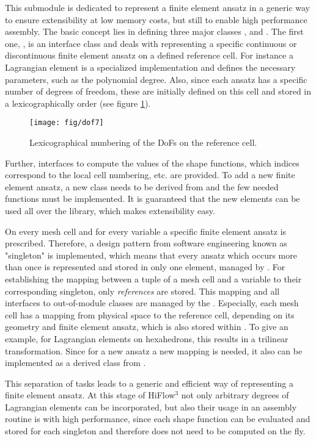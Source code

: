 This submodule is dedicated to represent a finite element ansatz in a
generic way to ensure extensibility at low memory costs, but still
to enable high performance assembly. The basic concept lies in defining
three major classes ,  and .
The first one, , is an interface class and deals with 
representing a specific continuous or discontinuous finite element 
ansatz on a defined reference cell. For instance a Lagrangian
element  is a specialized implementation
and defines the necessary parameters, such as the polynomial degree. 
Also, since each ansatz has a specific number of degrees
of freedom, these are initially defined on this cell and stored
in a lexicographically order (see figure \ref{fig:Lexicographic-numbering}). 
\begin{figure}
\noindent
\begin{centering}
\texttt{[image: fig/dof7]}
\par\end{centering}
\caption{\label{fig:Lexicographic-numbering}Lexicographical numbering of the DoFs on the reference cell.}
\end{figure}
Further, interfaces to compute the values of the shape functions, which indices 
correspond to the local cell numbering, etc. are provided. 
To add a new finite element ansatz, a new class needs to be derived from 
 and the few needed functions must be implemented. It is
guaranteed that the new elements can be used all over the library, which
makes extensibility easy. 
\par 
On every mesh cell and for every variable a specific finite element
ansatz is prescribed. Therefore, a design pattern from software engineering
known as "singleton" is implemented, which means that every ansatz which occurs
more than once is represented and stored in only one element, managed 
by . For establishing the mapping between a tuple
of a mesh cell and a variable to their corresponding singleton, only \emph{references}
are stored. This mapping and all interfaces to out-of-module classes are
managed by the . Especially, each mesh cell has a mapping
from physical space to the reference cell, depending on its geometry and finite
element ansatz, which is also stored within . To give an example, 
for Lagrangian elements on hexahedrons, this results in a trilinear transformation. 
Since for a new ansatz a new mapping is needed, it also can be implemented as a 
derived class from .
\par 
This separation of tasks leads to a generic and efficient way of representing
a finite element ansatz. At this stage of HiFlow$^3$ not only arbitrary degrees 
of Lagrangian elements can be incorporated, but also their usage in an assembly 
routine is with high performance, since each shape function can be evaluated
and stored for each singleton and therefore does not need to be computed on the fly.


